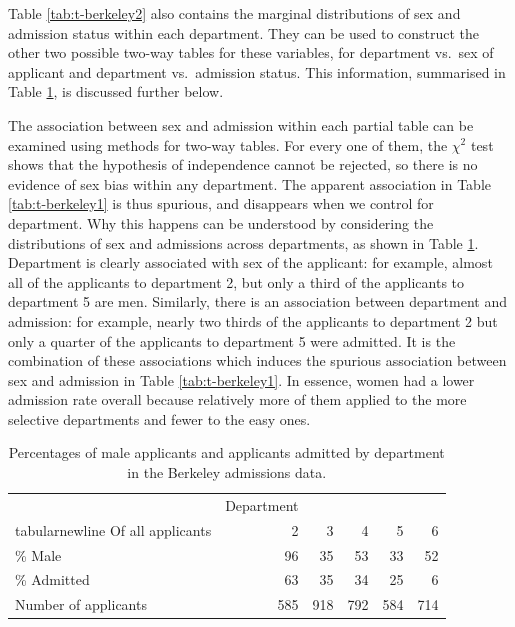 \documentclass[11pt,a4paper,openany]{book}
\begin{document}
Table \ref{tab:t-berkeley2} also contains the marginal distributions of
sex and admission status within each department. They can be used to
construct the other two possible two-way tables for these variables, for
department vs.~sex of applicant and department vs.~admission status.
This information, summarised in Table \ref{tab:t-berkeley3}, is
discussed further below.

The association between sex and admission within each partial table can
be examined using methods for two-way tables. For every one of them, the
\(\chi^{2}\) test shows that the hypothesis of independence cannot be
rejected, so there is no evidence of sex bias within any department. The
apparent association in Table \ref{tab:t-berkeley1} is thus spurious,
and disappears when we control for department. Why this happens can be
understood by considering the distributions of sex and admissions across
departments, as shown in Table \ref{tab:t-berkeley3}. Department is
clearly associated with sex of the applicant: for example, almost all of
the applicants to department 2, but only a third of the applicants to
department 5 are men. Similarly, there is an association between
department and admission: for example, nearly two thirds of the
applicants to department 2 but only a quarter of the applicants to
department 5 were admitted. It is the combination of these associations
which induces the spurious association between sex and admission in
Table \ref{tab:t-berkeley1}. In essence, women had a lower admission
rate overall because relatively more of them applied to the more
selective departments and fewer to the easy ones.

\begin{longtable}[]{@{}lrrrrr@{}}
\caption{\label{tab:t-berkeley3} Percentages of male applicants and
applicants admitted by department in the Berkeley admissions
data.}\tabularnewline
\toprule
\ & Department & \ & \ & \ & \\tabularnewline
Of all applicants & 2 & 3 & 4 & 5 & 6\tabularnewline
\% Male & 96 & 35 & 53 & 33 & 52\tabularnewline
\% Admitted & 63 & 35 & 34 & 25 & 6\tabularnewline
Number of applicants & 585 & 918 & 792 & 584 & 714\tabularnewline
\bottomrule
\end{longtable}
\end{document}
